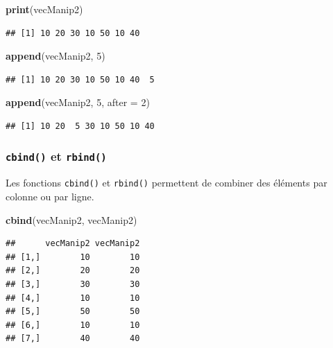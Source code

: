 \documentclass[]{book}
\newenvironment{Shaded}{\begin{snugshade}}{\end{snugshade}}
\newcommand{\DataTypeTok}[1]{\textcolor[rgb]{0.13,0.29,0.53}{#1}}
\newcommand{\DecValTok}[1]{\textcolor[rgb]{0.00,0.00,0.81}{#1}}
\newcommand{\KeywordTok}[1]{\textcolor[rgb]{0.13,0.29,0.53}{\textbf{#1}}}
\newcommand{\NormalTok}[1]{#1}
\begin{document}
\begin{Shaded}
\begin{Highlighting}[]
\KeywordTok{print}\NormalTok{(vecManip2)}
\end{Highlighting}
\end{Shaded}

\begin{verbatim}
## [1] 10 20 30 10 50 10 40
\end{verbatim}

\begin{Shaded}
\begin{Highlighting}[]
\KeywordTok{append}\NormalTok{(vecManip2, }\DecValTok{5}\NormalTok{)}
\end{Highlighting}
\end{Shaded}

\begin{verbatim}
## [1] 10 20 30 10 50 10 40  5
\end{verbatim}

\begin{Shaded}
\begin{Highlighting}[]
\KeywordTok{append}\NormalTok{(vecManip2, }\DecValTok{5}\NormalTok{, }\DataTypeTok{after =} \DecValTok{2}\NormalTok{)}
\end{Highlighting}
\end{Shaded}

\begin{verbatim}
## [1] 10 20  5 30 10 50 10 40
\end{verbatim}

\hypertarget{l015cbind}{%
\subsubsection{\texorpdfstring{\texttt{cbind()} et \texttt{rbind()}}{cbind() et rbind()}}\label{l015cbind}}

Les fonctions \texttt{cbind()} et \texttt{rbind()} permettent de combiner des éléments par colonne ou par ligne.

\begin{Shaded}
\begin{Highlighting}[]
\KeywordTok{cbind}\NormalTok{(vecManip2, vecManip2)}
\end{Highlighting}
\end{Shaded}

\begin{verbatim}
##      vecManip2 vecManip2
## [1,]        10        10
## [2,]        20        20
## [3,]        30        30
## [4,]        10        10
## [5,]        50        50
## [6,]        10        10
## [7,]        40        40
\end{verbatim}
\end{document}
